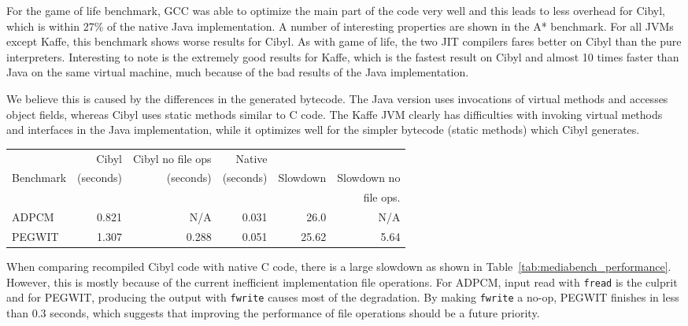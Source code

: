 For the game of life benchmark, GCC was able to optimize the main part of the
code very well and this leads to less overhead for Cibyl, which is within 27\%
of the native Java implementation. A number of interesting properties are
shown in the A* benchmark. For all JVMs except Kaffe, this benchmark shows
worse results for Cibyl. As with game of life, the two JIT compilers fares
better on Cibyl than the pure interpreters.  Interesting to note is the
extremely good results for Kaffe, which is the fastest result on Cibyl and
almost 10 times faster than Java on the same virtual machine, much because of
the bad results of the Java implementation.

We believe this is caused by the differences in the generated bytecode. The
Java version uses invocations of virtual methods and accesses object fields,
whereas Cibyl uses static methods similar to C code. The Kaffe JVM clearly has
difficulties with invoking virtual methods and interfaces in the Java
implementation, while it optimizes well for the simpler bytecode (static
methods) which Cibyl generates.

\begin{table*}[htb]
  \centering
  \caption[Mediabench benchmark results]{Performance results in seconds for the mediabench benchmarks. The Cibyl
    results were obtained with the Sun JVM.}
  \small
  \begin{tabular}{lrrr|rr}
              & Cibyl     & Cibyl no file ops & Native \\
    Benchmark & (seconds) & (seconds)         & (seconds)  & Slowdown & Slowdown no \\
              &           &                   &            &          & file ops. \\
    \hline
    ADPCM     & 0.821     & N/A               & 0.031      & 26.0     & N/A \\
    PEGWIT    & 1.307     & 0.288             & 0.051      & 25.62    & 5.64\\
  \end{tabular}
  \label{tab:mediabench_performance}
\end{table*}

When comparing recompiled Cibyl code with native C code, there is a large
slowdown as shown in Table~\ref{tab:mediabench_performance}. However, this is
mostly because of the current inefficient implementation file operations. For
ADPCM, input read with \texttt{fread} is the culprit and for PEGWIT, producing
the output with \texttt{fwrite} causes most of the degradation. By making
\texttt{fwrite} a no-op, PEGWIT finishes in less than 0.3 seconds, which
suggests that improving the performance of file operations should be a future
priority.

